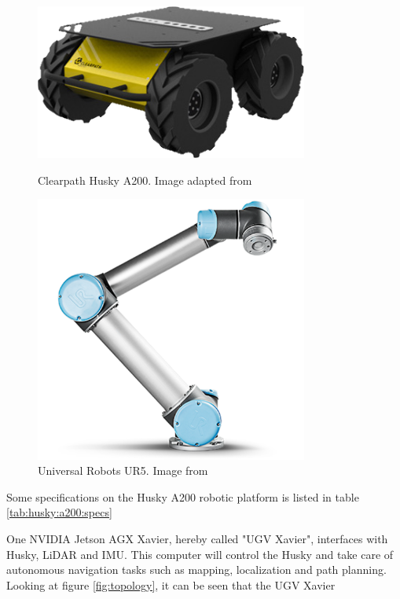 \begin{figure}[H]
  \centering
  \begin{minipage}[b]{0.49\textwidth}
        \centering
        \includegraphics[width = 0.8\textwidth]{Figures/huskyA200.png}
        \caption{Clearpath Husky A200. Image adapted from \cite{clearpath_husky_website}}
        \label{fig:huskyA200}
  \end{minipage}
  \hfill
  \begin{minipage}[b]{0.49\textwidth}
    \centering
    \includegraphics[width = 0.8\textwidth]{Figures/ur5.png}
    \caption{Universal Robots UR5. Image from \cite{ur5_img}}
    \label{fig:ur5}
  \end{minipage}
\end{figure}

Some specifications on the Husky A200 robotic platform is listed in table \ref{tab:husky:a200:specs}



One NVIDIA Jetson AGX Xavier, hereby called "UGV Xavier", interfaces with Husky, LiDAR and IMU. This computer will control the Husky and take care of autonomous navigation tasks such as mapping, localization and path planning. Looking at figure \ref{fig:topology}, it can be seen that the UGV Xavier 


